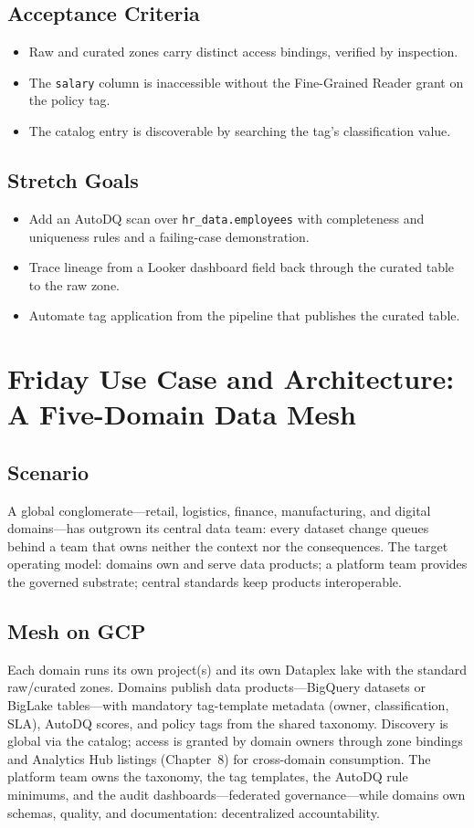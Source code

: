 \subsection*{Acceptance Criteria}
\begin{itemize}
    \item Raw and curated zones carry distinct access bindings, verified by inspection.
    \item The \texttt{salary} column is inaccessible without the Fine-Grained Reader grant on the policy tag.
    \item The catalog entry is discoverable by searching the tag's classification value.
\end{itemize}

\subsection*{Stretch Goals}
\begin{itemize}
    \item Add an AutoDQ scan over \texttt{hr\_data.employees} with completeness and uniqueness rules and a failing-case demonstration.
    \item Trace lineage from a Looker dashboard field back through the curated table to the raw zone.
    \item Automate tag application from the pipeline that publishes the curated table.
\end{itemize}

\section{Friday Use Case and Architecture: A Five-Domain Data Mesh}

\subsection{Scenario}
A global conglomerate---retail, logistics, finance, manufacturing, and digital domains---has outgrown its central data team: every dataset change queues behind a team that owns neither the context nor the consequences. The target operating model: domains own and serve data products; a platform team provides the governed substrate; central standards keep products interoperable.

\subsection{Mesh on GCP}
Each domain runs its own project(s) and its own Dataplex lake with the standard raw/curated zones. Domains publish data products---BigQuery datasets or BigLake tables---with mandatory tag-template metadata (owner, classification, SLA), AutoDQ scores, and policy tags from the shared taxonomy. Discovery is global via the catalog; access is granted by domain owners through zone bindings and Analytics Hub listings (Chapter~8) for cross-domain consumption. The platform team owns the taxonomy, the tag templates, the AutoDQ rule minimums, and the audit dashboards---federated governance---while domains own schemas, quality, and documentation: decentralized accountability.

